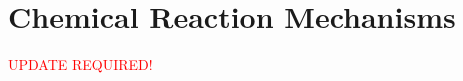 \chapter{Chemical Reaction Mechanisms}\label{appendix:mechanisms}

\textcolor{red}{UPDATE REQUIRED!}
